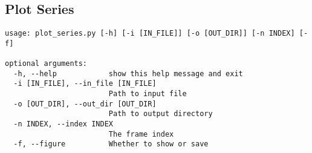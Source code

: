 \subsection{Plot Series}
\label{sec:orgd690f64}
\begin{verbatim}
usage: plot_series.py [-h] [-i [IN_FILE]] [-o [OUT_DIR]] [-n INDEX] [-f]

optional arguments:
  -h, --help            show this help message and exit
  -i [IN_FILE], --in_file [IN_FILE]
                        Path to input file
  -o [OUT_DIR], --out_dir [OUT_DIR]
                        Path to output directory
  -n INDEX, --index INDEX
                        The frame index
  -f, --figure          Whether to show or save
\end{verbatim}
